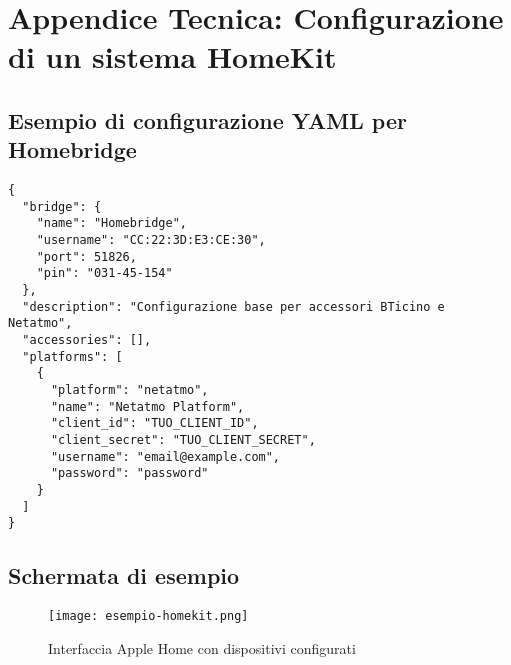 \chapter{Appendice Tecnica: Configurazione di un sistema HomeKit}
\section*{Esempio di configurazione YAML per Homebridge}
\begin{verbatim}
{
  "bridge": {
    "name": "Homebridge",
    "username": "CC:22:3D:E3:CE:30",
    "port": 51826,
    "pin": "031-45-154"
  },
  "description": "Configurazione base per accessori BTicino e Netatmo",
  "accessories": [],
  "platforms": [
    {
      "platform": "netatmo",
      "name": "Netatmo Platform",
      "client_id": "TUO_CLIENT_ID",
      "client_secret": "TUO_CLIENT_SECRET",
      "username": "email@example.com",
      "password": "password"
    }
  ]
}
\end{verbatim}

\section*{Schermata di esempio}
\begin{figure}[h!]
    \centering
    \texttt{[image: esempio-homekit.png]}
    \caption{Interfaccia Apple Home con dispositivi configurati}
    \label{fig:homekit-interface}
\end{figure}

